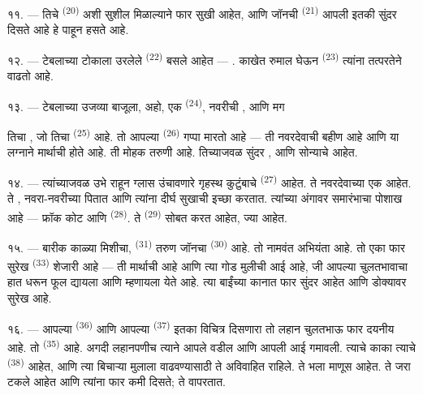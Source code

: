 ११. --- तिचे  \textsuperscript{(20)} अशी सुशील 
मिळाल्याने फार सुखी आहेत, आणि जॉनची  \textsuperscript{(21)} आपली
 इतकी सुंदर दिसते आहे हे पाहून हसते आहे.

१२. --- टेबलाच्या टोकाला उरलेले  \textsuperscript{(22)} बसले
आहेत --- . काखेत रुमाल घेऊन
 \textsuperscript{(23)} त्यांना तत्परतेने वाढतो आहे.

\VUsaut{3.0mm}

१३. --- टेबलाच्या उजव्या बाजूला, अहो, एक  \textsuperscript{(24)},
नवरीची , आणि मग

तिचा , जो तिचा  \textsuperscript{(25)} आहे. तो आपल्या
 \textsuperscript{(26)} गप्पा मारतो आहे --- ती नवरदेवाची बहीण आहे
आणि या लग्नाने मार्थाची  होते आहे. ती मोहक तरुणी आहे. तिच्याजवळ
सुंदर ,  आणि सोन्याचे  आहेत.

१४. --- त्यांच्याजवळ उभे राहून ग्लास उंचावणारे गृहस्थ कुटुंबाचे 
\textsuperscript{(27)} आहेत. ते नवरदेवाच्या  एक आहेत. ते
, नवरा-नवरीच्या  पितात आणि त्यांना
दीर्घ सुखाची इच्छा करतात. त्यांच्या अंगावर समारंभाचा पोशाख आहे --- फ्रॉक कोट
आणि  \textsuperscript{(28)}. ते 
\textsuperscript{(29)} सोबत करत आहेत, ज्या  आहेत.

१५. --- बारीक काळ्या मिशीचा,  \textsuperscript{(31)} तरुण
जॉनचा  \textsuperscript{(30)} आहे. तो नामवंत अभियंता आहे. तो एका फार
सुरेख  \textsuperscript{(33)} शेजारी आहे --- ती मार्थाची
 आहे आणि त्या गोड मुलीची आई आहे, जी आपल्या चुलतभावाचा हात धरून
फूल द्यायला आणि  म्हणायला येते आहे. त्या बाईंच्या कानात
फार सुंदर  आहेत आणि डोक्यावर सुरेख  आहे.

१६. --- आपल्या  \textsuperscript{(36)} आणि आपल्या
 \textsuperscript{(37)} इतका विचित्र दिसणारा तो लहान
चुलतभाऊ फार दयनीय आहे. तो  \textsuperscript{(35)} आहे. अगदी लहानपणीच
त्याने आपले वडील आणि आपली आई गमावली. त्याचे काका त्याचे 
\textsuperscript{(38)} आहेत, आणि त्या बिचाऱ्या मुलाला वाढवण्यासाठी ते अविवाहित
राहिले. ते भला माणूस आहेत. ते जरा टकले आहेत आणि त्यांना फार कमी दिसते; ते
 वापरतात.

